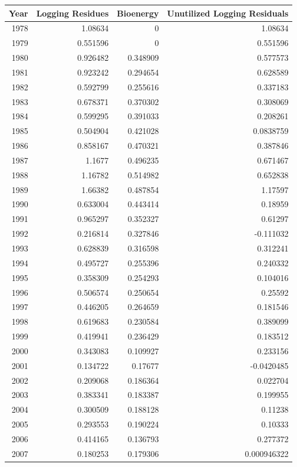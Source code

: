 \documentclass[a4paper,titlepage]{article}
\begin{document}
\begin{table}[htb]
\centering
\begin{tabular}{rrrr}
Year & Logging Residues & Bioenergy & Unutilized Logging Residuals\\
\hline
1978 & 1.08634 & 0 & 1.08634\\
1979 & 0.551596 & 0 & 0.551596\\
1980 & 0.926482 & 0.348909 & 0.577573\\
1981 & 0.923242 & 0.294654 & 0.628589\\
1982 & 0.592799 & 0.255616 & 0.337183\\
1983 & 0.678371 & 0.370302 & 0.308069\\
1984 & 0.599295 & 0.391033 & 0.208261\\
1985 & 0.504904 & 0.421028 & 0.0838759\\
1986 & 0.858167 & 0.470321 & 0.387846\\
1987 & 1.1677 & 0.496235 & 0.671467\\
1988 & 1.16782 & 0.514982 & 0.652838\\
1989 & 1.66382 & 0.487854 & 1.17597\\
1990 & 0.633004 & 0.443414 & 0.18959\\
1991 & 0.965297 & 0.352327 & 0.61297\\
1992 & 0.216814 & 0.327846 & -0.111032\\
1993 & 0.628839 & 0.316598 & 0.312241\\
1994 & 0.495727 & 0.255396 & 0.240332\\
1995 & 0.358309 & 0.254293 & 0.104016\\
1996 & 0.506574 & 0.250654 & 0.25592\\
1997 & 0.446205 & 0.264659 & 0.181546\\
1998 & 0.619683 & 0.230584 & 0.389099\\
1999 & 0.419941 & 0.236429 & 0.183512\\
2000 & 0.343083 & 0.109927 & 0.233156\\
2001 & 0.134722 & 0.17677 & -0.0420485\\
2002 & 0.209068 & 0.186364 & 0.022704\\
2003 & 0.383341 & 0.183387 & 0.199955\\
2004 & 0.300509 & 0.188128 & 0.11238\\
2005 & 0.293553 & 0.190224 & 0.10333\\
2006 & 0.414165 & 0.136793 & 0.277372\\
2007 & 0.180253 & 0.179306 & 0.000946322\\

\end{tabular}
\end{table}
\end{document}
